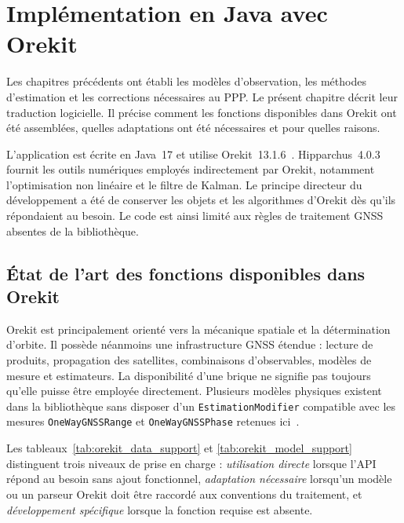 
\chapter{Implémentation en Java avec Orekit}
\label{implementation_orekit}

Les chapitres précédents ont établi les modèles d'observation, les méthodes
d'estimation et les corrections nécessaires au PPP. Le présent chapitre décrit
leur traduction logicielle. Il
précise comment les fonctions disponibles dans Orekit ont été assemblées,
quelles adaptations ont été nécessaires et pour quelles raisons.

L'application est écrite en Java~17 et utilise Orekit~13.1.6~\cite{orekit131api}. Hipparchus~4.0.3~\cite{hipparchus403}
fournit les outils numériques employés indirectement par Orekit, notamment
l'optimisation non linéaire et le filtre de Kalman. Le principe directeur du
développement a été de conserver les objets et les algorithmes d'Orekit dès
qu'ils répondaient au besoin. Le code est ainsi limité aux règles
de traitement GNSS absentes de la bibliothèque.



\section{État de l'art des fonctions disponibles dans Orekit}
\label{sec:orekit_state_of_art}

Orekit est principalement orienté vers la mécanique spatiale et la
détermination d'orbite. Il possède néanmoins une infrastructure GNSS étendue :
lecture de produits, propagation des satellites, combinaisons d'observables,
modèles de mesure et estimateurs. La disponibilité d'une brique ne signifie
pas toujours qu'elle puisse être employée directement. Plusieurs modèles
physiques existent dans la bibliothèque sans disposer d'un
\texttt{EstimationModifier} compatible avec les mesures
\texttt{OneWayGNSSRange} et \texttt{OneWayGNSSPhase} retenues ici~\cite{orekit131api}.

Les tableaux~\ref{tab:orekit_data_support} et
\ref{tab:orekit_model_support} distinguent trois niveaux de prise en charge :
\emph{utilisation directe} lorsque l'API répond au besoin sans ajout
fonctionnel, \emph{adaptation nécessaire} lorsqu'un modèle ou un parseur
Orekit doit être raccordé aux conventions du traitement, et
\emph{développement spécifique} lorsque la fonction requise est absente.

